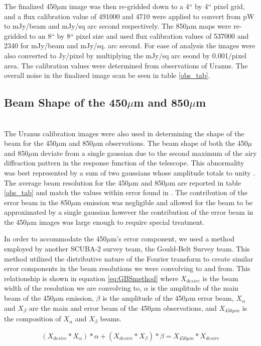 The finalized 450$\mu$m image was then re-gridded down to a 4`` by 4`` pixel grid, and a flux calibration value of 491000 and 4710 were applied to convert from pW to mJy/beam and mJy/sq arc second respectively.  The 850$\mu$m maps were re-gridded to an 8`` by 8`` pixel size and used flux calibration values of 537000 and 2340 for mJy/beam and mJy/sq. arc second.   For ease of analysis the images were also converted to Jy/pixel by multiplying the mJy/sq arc seond by 0.001/pixel area.  The calibration values were determined from observations of Uranus.   The overall noise in the finalized image scan be seen in table \ref{obs_tab}.

\subsection{Beam Shape of the 450$\mu$m and 850$\mu$m} \\
The Uranus calibration images were also used in determining the shape of the beam for the 450$\mu$m and 850$\mu$m observations.  The beam shape of both the 450$\mu$ and 850$\mu$m deviate from a single gaussian due to the second maximum of the airy diffraction pattern in the response function of the telescope.  This abnormality was best represented by a sum of two gaussians whose amplitude totals to unity \citet{dempsey2013}.  The average beam resolution for the 450$\mu$m and 850$\mu$m are reported in table \ref{obs_tab} and match the values within error found in \citet{dempsey2013}.  The contribution of the error beam in the 850$\mu$m emission was negligible and allowed for the beam to be approximated by a single gaussian however the contribution of the error beam in the 450$\mu$m images was large enough to require special treatment.

In order to accommodate the 450$\mu$m's error component, we used a method employed by another SCUBA-2 survey team, the Gould-Belt Survey team.  This method utilized the distributive nature of the Fourier transform to create similar error components in the beam resolutions we were convolving to and from.  This relationship is shown in equation \ref{eq:GBSmethod} where $X_{desire}$ is the beam width of the resolution we are convolving to, $\alpha$ is the amplitude of the main beam of the 450$\mu$m emission, $\beta$ is the amplitude of the 450$\mu$m error beam, $X_{\alpha}$ and $X_{\beta}$ are the main and error beam of the 450$\mu$m observations, and $X_{450\mu m}$ is the composition of $X_{\alpha}$ and $X_{\beta}$ beams.

\begin{equation} \label{eq:GBSmethod}
  \left(X_{desire} \ast X_{\alpha}\right)*\alpha + \left(X_{desire} \ast X_{\beta}\right)*\beta = X_{450\mu m} \ast X_{desire}
\end{equation}

